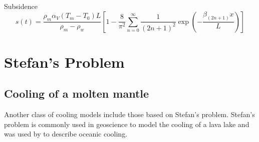\documentclass[final,12pt,a4paper]{article}
\begin{document}
Subsidence
\begin{equation}
    s(t) = \frac{\rho_{m} \alpha_{V} (T_{m} - T_{0}) L}{\rho_{m} - \rho_{w}}
        \left[ 1 - \frac{8}{\pi^2} \sum_{n = 0}^{\infty} \frac{1}{(2 n + 1)^2}
        \exp\left( -\frac{\beta_{(2n + 1)} x}{L} \right) \right]
\end{equation}



\section{Stefan's Problem}
\subsection{Cooling of a molten mantle}
Another class of cooling models include those based on Stefan's problem.
Stefan's problem is commonly used in geoscience to model the cooling of
a lava lake and was used by \cite{Parker&Oldenburg1973} to describe
oceanic cooling.
\end{document}
